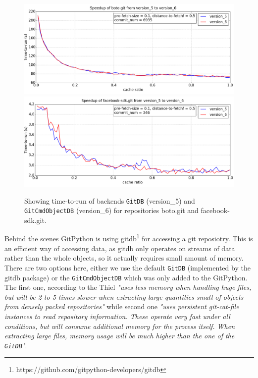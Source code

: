 \documentclass[12pt,twoside,notitlepage]{report}
\begin{document}
\begin{figure}[h]
\includegraphics[width=1.0\textwidth]{db_backend-1.png}
\includegraphics[width=1.0\textwidth]{db_backend-2.png}

\captionsetup{width=0.95\textwidth}
\caption{Showing time-to-run of backends \texttt{GitDB} (version\_5) and \texttt{GitCmdObjectDB} (version\_6) for repositories boto.git and facebook-sdk.git.}
\label{boto_gitdb}
\end{figure}
Behind the scenes GitPython is using gitdb\footnote{https://github.com/gitpython-developers/gitdb} for accessing a git reposiotry. This is an efficient way of accessing data, as gitdb only operates on streams of data rather than the whole objects, so it actually requires small amount of memory. There are two options here, either we use the default \texttt{GitDB} (implemented by the gitdb package) or the \texttt{GitCmdObjectDB} which was only added to the GitPython. The first one, according to the Thiel \textit{"uses less memory when handling huge files, but will be 2 to 5 times slower when extracting large quantities
small of objects from densely packed repositories"} while second one \textit{"uses persistent git-cat-file instances to read repository information. These operate very fast under all conditions, but will consume additional memory for the process itself. When extracting large files, memory
usage will be much higher than the one of the \texttt{GitDB}"}.
\end{document}
